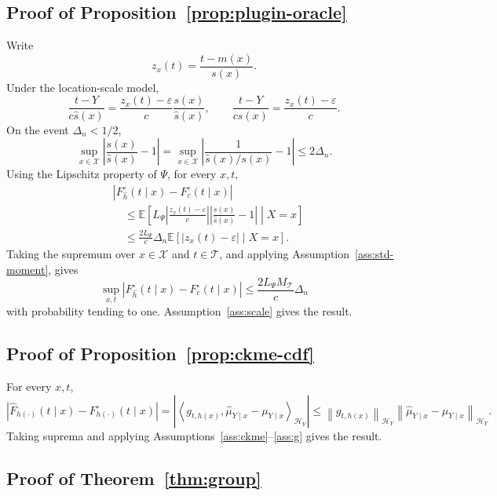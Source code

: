 \documentclass[11pt]{article}
\newcommand{\Xcal}{\mathcal X}
\newcommand{\Hcal}{\mathcal H}
\newcommand{\Tcal}{\mathcal T}
\newcommand{\E}{\mathbb E}
\newcommand{\norm}[1]{\left\lVert #1 \right\rVert}
\newcommand{\abs}[1]{\left\lvert #1 \right\rvert}
\newcommand{\inner}[2]{\left\langle #1,#2 \right\rangle}
\begin{document}
\subsection{Proof of Proposition~\ref{prop:plugin-oracle}}

Write
\[
  z_x(t)=\frac{t-m(x)}{s(x)}.
\]
Under the location-scale model,
\[
  \frac{t-Y}{c\widehat s(x)}
  =
  \frac{z_x(t)-\varepsilon}{c}\frac{s(x)}{\widehat s(x)},
  \qquad
  \frac{t-Y}{c s(x)}
  =
  \frac{z_x(t)-\varepsilon}{c}.
\]
On the event \(\Delta_n<1/2\),
\[
  \sup_{x\in\Xcal}
  \abs{\frac{s(x)}{\widehat s(x)}-1}
  =
  \sup_{x\in\Xcal}
  \abs{\frac{1}{\widehat s(x)/s(x)}-1}
  \le
  2\Delta_n .
\]
Using the Lipschitz property of \(\Psi\), for every \(x,t\),
\[
\begin{aligned}
  &\abs{F_{\widehat h}^{\circ}(t\mid x)-F_c^\circ(t\mid x)} \\
  &\quad\le
  \E\left[
  L_\Psi
  \abs{\frac{z_x(t)-\varepsilon}{c}}
  \abs{\frac{s(x)}{\widehat s(x)}-1}
  \middle|X=x
  \right]  \\
  &\quad\le
  \frac{2L_\Psi}{c}\Delta_n
  \E\left[
  \abs{z_x(t)-\varepsilon}
  \middle|X=x
  \right].
\end{aligned}
\]
Taking the supremum over \(x\in\Xcal\) and \(t\in\Tcal\), and applying Assumption~\ref{ass:std-moment}, gives
\[
  \sup_{x,t}
  \abs{F_{\widehat h}^{\circ}(t\mid x)-F_c^\circ(t\mid x)}
  \le
  \frac{2L_\Psi M_{\Tcal}}{c}\Delta_n
\]
with probability tending to one. Assumption~\ref{ass:scale} gives the result.

\subsection{Proof of Proposition~\ref{prop:ckme-cdf}}

For every \(x,t\),
\[
  \abs{\widehat F_{h(\cdot)}(t\mid x)-F_{h(\cdot)}^\circ(t\mid x)}
  =
  \abs{\inner{g_{t,h(x)}}{\widehat\mu_{Y\mid x}-\mu_{Y\mid x}}_{\Hcal_Y}}
  \le
  \norm{g_{t,h(x)}}_{\Hcal_Y}
  \norm{\widehat\mu_{Y\mid x}-\mu_{Y\mid x}}_{\Hcal_Y}.
\]
Taking suprema and applying Assumptions~\ref{ass:ckme}--\ref{ass:g} gives the result.

\subsection{Proof of Theorem~\ref{thm:group}}
\end{document}
